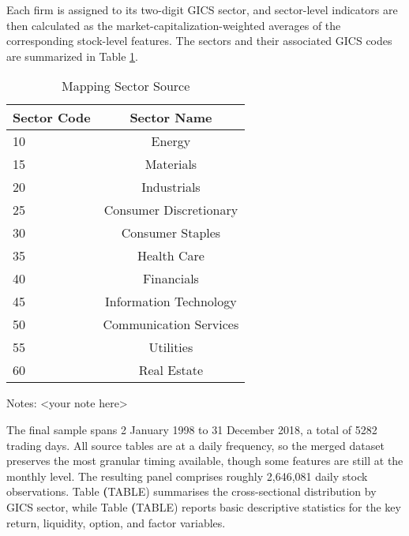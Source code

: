 Each firm is assigned to its two-digit GICS sector, and sector-level indicators are then calculated as the market-capitalization-weighted averages of the corresponding stock-level features.  The sectors and their associated GICS codes are summarized in Table \ref{tab:sectors_mapp}.  

\begin{table}[htbp]
     \centering
     \caption{Mapping Sector Source}
     \label{tab:sectors_mapp}
     \begin{threeparttable}             %
         \begin{tabular}{@{}l c@{}}
             \toprule
             \textbf{Sector Code} & \textbf{Sector Name}\\
             \midrule
             10 & Energy\\
             15 & Materials\\
             20 & Industrials\\
             25 & Consumer Discretionary\\
             30 & Consumer Staples\\
             35 & Health Care\\
             40 & Financials\\
             45 & Information Technology\\
             50 & Communication Services\\
             55 & Utilities\\
             60 & Real Estate\\
             \bottomrule
         \end{tabular}
 
         \begin{tablenotes}
             \footnotesize
             \item[] Notes: <your note here>
         \end{tablenotes}
     \end{threeparttable}               %
 \end{table}

The final sample spans 2 January 1998 to 31 December 2018, a total of 5282 trading days. All source tables are at a daily frequency, so the merged dataset preserves the most granular timing available, though some features are still at the monthly level. The resulting panel comprises roughly 2,646,081 daily stock observations. Table \textbf(TABLE) summarises the cross-sectional distribution by GICS sector, while Table \textbf(TABLE) reports basic descriptive statistics for the key return, liquidity, option, and factor variables. 




